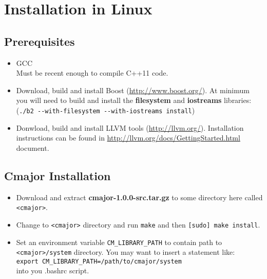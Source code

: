 \documentclass[oneside, a4paper, 11pt]{article}
\begin{document}
\section{Installation in Linux}

\subsection{Prerequisites}

\begin{itemize}

\item
GCC\\
Must be recent enough to compile C++11 code.

\item
Download, build and install Boost (\url{http://www.boost.org/}).
At minimum you will need to build and install the
\textbf{filesystem} and \textbf{iostreams} libraries:\\
(\verb|./b2 --with-filesystem --with-iostreams install|)

\item
Donwload, build and install LLVM tools (\url{http://llvm.org/}).
Installation instructions can be found in \url{http://llvm.org/docs/GettingStarted.html} document.

\end{itemize}

\subsection{Cmajor Installation}

\begin{itemize}

\item
Download and extract \textbf{cmajor-1.0.0-src.tar.gz} to some directory here called \verb|<cmajor>|.

\item
Change to \verb|<cmajor>| directory and run \verb|make| and then \verb|[sudo] make install|.

\item
Set an environment variable \verb|CM_LIBRARY_PATH| to contain path to \verb|<cmajor>/system| directory.
You may want to insert a statement like:\\
\verb|export CM_LIBRARY_PATH=/path/to/cmajor/system|\\
into you .bashrc script.

\end{itemize}
\end{document}
